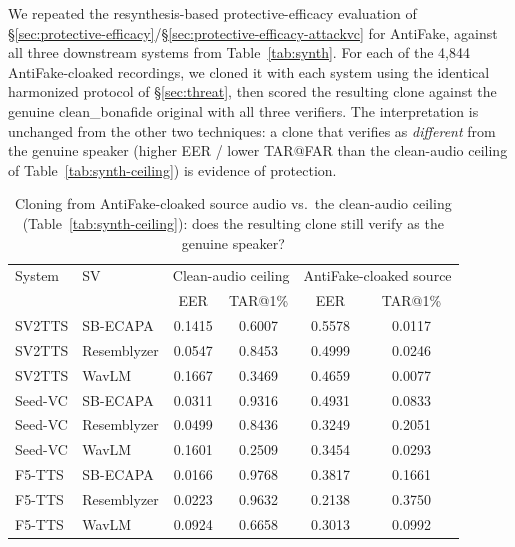 \documentclass[11pt]{article}
\begin{document}
We repeated the resynthesis-based protective-efficacy evaluation of
\S\ref{sec:protective-efficacy}/\S\ref{sec:protective-efficacy-attackvc}
for AntiFake, against all three downstream systems from
Table~\ref{tab:synth}. For each of the 4,844 AntiFake-cloaked
recordings, we cloned it with each system using the identical
harmonized protocol of \S\ref{sec:threat}, then scored the resulting
clone against the genuine clean\_bonafide original with all three
verifiers. The interpretation is unchanged from the other two
techniques: a clone that verifies as \emph{different} from the genuine
speaker (higher EER / lower TAR@FAR than the clean-audio ceiling of
Table~\ref{tab:synth-ceiling}) is evidence of protection.

\begin{table}[H]
\centering
\caption{Cloning from AntiFake-cloaked source audio vs.\ the
clean-audio ceiling (Table~\ref{tab:synth-ceiling}): does the resulting
clone still verify as the genuine speaker?}
\label{tab:protective-efficacy-antifake}
\begin{tabular}{llcccc}
\toprule
System & SV & \multicolumn{2}{c}{Clean-audio ceiling} & \multicolumn{2}{c}{AntiFake-cloaked source} \\
       &    & EER & TAR@1\% & EER & TAR@1\% \\
\midrule
SV2TTS   & SB-ECAPA    & 0.1415 & 0.6007 & 0.5578 & 0.0117 \\
SV2TTS   & Resemblyzer & 0.0547 & 0.8453 & 0.4999 & 0.0246 \\
SV2TTS   & WavLM       & 0.1667 & 0.3469 & 0.4659 & 0.0077 \\
\addlinespace
Seed-VC  & SB-ECAPA    & 0.0311 & 0.9316 & 0.4931 & 0.0833 \\
Seed-VC  & Resemblyzer & 0.0499 & 0.8436 & 0.3249 & 0.2051 \\
Seed-VC  & WavLM       & 0.1601 & 0.2509 & 0.3454 & 0.0293 \\
\addlinespace
F5-TTS   & SB-ECAPA    & 0.0166 & 0.9768 & 0.3817 & 0.1661 \\
F5-TTS   & Resemblyzer & 0.0223 & 0.9632 & 0.2138 & 0.3750 \\
F5-TTS   & WavLM       & 0.0924 & 0.6658 & 0.3013 & 0.0992 \\
\bottomrule
\end{tabular}
\end{table}
\end{document}
